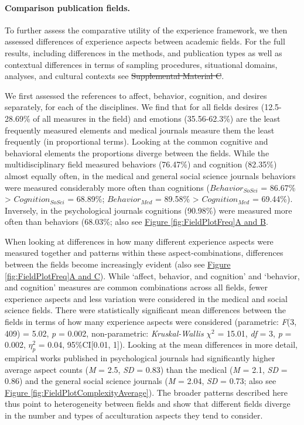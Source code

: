 \documentclass[man, 12pt, a4paper, mask]{apa7}
\newcommand{\fgrref}[2][]{\hyperref[#2]{Figure \ref*{#2}#1}}
\newcommand{\siannotatedanalyses}{Supplemental Material B} %
\providecommand{\DIFaddtex}[1]{{\protect\color{blue}\uwave{#1}}} %
\providecommand{\DIFdeltex}[1]{{\protect\color{red}\sout{#1}}}                      %
\providecommand{\DIFaddbegin}{} %
\providecommand{\DIFaddend}{} %
\providecommand{\DIFdelbegin}{} %
\providecommand{\DIFdelend}{} %
\providecommand{\DIFadd}[1]{\texorpdfstring{\DIFaddtex{#1}}{#1}} %
\providecommand{\DIFdel}[1]{\texorpdfstring{\DIFdeltex{#1}}{}} %
\newcommand{\DIFscaledelfig}{0.5}
\newlength{\DIFdelgraphicswidth} %
\newlength{\DIFdelgraphicsheight} %
\newcommand{\DIFaddincludegraphics}[2][]{{\color{blue}\fbox{\DIFOincludegraphics[#1]{#2}}}} %
\newcommand{\DIFdelincludegraphics}[2][]{%
\sbox{\DIFdelgraphicsbox}{\DIFOincludegraphics[#1]{#2}}%
\settoboxwidth{\DIFdelgraphicswidth}{\DIFdelgraphicsbox} %
\settoboxtotalheight{\DIFdelgraphicsheight}{\DIFdelgraphicsbox} %
\scalebox{\DIFscaledelfig}{%
\parbox[b]{\DIFdelgraphicswidth}{\usebox{\DIFdelgraphicsbox}\\[-\baselineskip] \rule{\DIFdelgraphicswidth}{0em}}\llap{\resizebox{\DIFdelgraphicswidth}{\DIFdelgraphicsheight}{%
\setlength{\unitlength}{\DIFdelgraphicswidth}%
\begin{picture}(1,1)%
\thicklines\linethickness{2pt} %
{\color[rgb]{1,0,0}\put(0,0){\framebox(1,1){}}}%
{\color[rgb]{1,0,0}\put(0,0){\line( 1,1){1}}}%
{\color[rgb]{1,0,0}\put(0,1){\line(1,-1){1}}}%
\end{picture}%
}\hspace*{3pt}}} %
} %
\DeclareRobustCommand{\DIFaddbegin}{\DIFOaddbegin \let\includegraphics\DIFaddincludegraphics} %
\DeclareRobustCommand{\DIFaddend}{\DIFOaddend \let\includegraphics\DIFOincludegraphics} %
\DeclareRobustCommand{\DIFdelbegin}{\DIFOdelbegin \let\includegraphics\DIFdelincludegraphics} %
\DeclareRobustCommand{\DIFdelend}{\DIFOaddend \let\includegraphics\DIFOincludegraphics} %
\begin{document}
\paragraph{Comparison publication fields.}

To further assess the comparative utility of the experience framework,
we then assessed differences of experience aspects between academic
fields. For the full results, including differences in the methods, and
publication types as well as contextual differences in terms of sampling
procedures, situational domains, analyses, and cultural contexts see
\DIFdelbegin \DIFdel{Supplemental Material C}\DIFdelend \DIFaddbegin \DIFadd{\siannotatedanalyses}\DIFaddend .

We first assessed the references to affect, behavior, cognition, and
desires separately, for each of the disciplines. We find that for all
fields desires (12.5-28.69\% of all measures in the field) and emotions
(35.56-62.3\%) are the least frequently measured elements and medical
journals measure them the least frequently (in proportional terms).
Looking at the common cognitive and behavioral elements the proportions
diverge between the fields. While the multidisciplinary field measured
behaviors (76.47\%) and cognition (82.35\%) almost equally often, in the
medical and general social science journals behaviors were measured
considerably more often than cognitions (\(Behavior_{SoSci}\) = 86.67\%
\textgreater{} \(Cognition_{SoSci}\) = 68.89\%; \(Behavior_{Med}\) =
89.58\% \textgreater{} \(Cognition_{Med}\) = 69.44\%). Inversely, in the
psychological journals cognitions (90.98\%) were measured more often
than behaviors (68.03\%; also see \fgrref[A and B]{fig:FieldPlotFreq}.

When looking at differences in how many different experience aspects
were measured together and patterns within these aspect-combinations,
differences between the fields become increasingly evident (also see
\fgrref[A and C]{fig:FieldPlotFreq}). While `affect, behavior, and
cognition' and `behavior, and cognition' measures are common
combinations across all fields, fewer experience aspects and less
variation were considered in the medical and social science fields.
There were statistically significant mean differences between the fields
in terms of how many experience aspects were considered (parametric:
\textit{F}(3, 409) = 5.02, \textit{p} = 0.002, non-parametric:
\textit{Kruskal-Wallis} \(\chi^{2}\) = 15.01, \textit{df} = 3,
\textit{p} = 0.002, \(\eta_{p}^{2}\) = 0.04, 95\%CI{[}0.01, 1{]}).
Looking at the mean differences in more detail, empirical works
published in psychological journals had significantly higher average
aspect counts (\textit{M} = 2.5, \textit{SD} = 0.83) than the medical
(\textit{M} = 2.1, \textit{SD} = 0.86) and the general social science
journals (\textit{M} = 2.04, \textit{SD} = 0.73; also see
\fgrref{fig:FieldPlotComplexityAverage}). The broader patterns described
here thus point to heterogeneity between fields and show that different
fields diverge in the number and types of acculturation aspects they
tend to consider.
\end{document}
